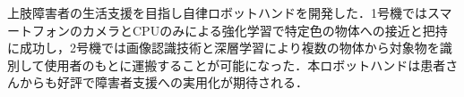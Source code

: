 上肢障害者の生活支援を目指し自律ロボットハンドを開発した．1号機ではスマートフォンのカメラとCPUのみによる強化学習で特定色の物体への接近と把持に成功し，2号機では画像認識技術と深層学習により複数の物体から対象物を識別して使用者のもとに運搬することが可能になった．本ロボットハンドは患者さんからも好評で障害者支援への実用化が期待される．

